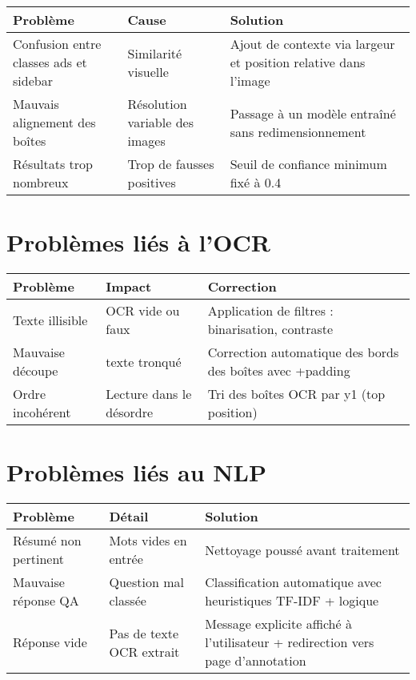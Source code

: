 \documentclass[12pt,a4paper]{report}
\begin{document}
\begin{longtable}{|p{3cm}|p{5cm}|p{6cm}|}
\hline
\textbf{Problème} & \textbf{Cause} & \textbf{Solution} \\
\hline
Confusion entre classes ads et sidebar & Similarité visuelle & Ajout de contexte via largeur et position relative dans l'image \\
\hline
Mauvais alignement des boîtes & Résolution variable des images & Passage à un modèle entraîné sans redimensionnement \\
\hline
Résultats trop nombreux & Trop de fausses positives & Seuil de confiance minimum fixé à 0.4 \\
\hline
\end{longtable}

\section{Problèmes liés à l'OCR}

\begin{longtable}{|p{3cm}|p{5cm}|p{6cm}|}
\hline
\textbf{Problème} & \textbf{Impact} & \textbf{Correction} \\
\hline
Texte illisible & OCR vide ou faux & Application de filtres : binarisation, contraste \\
\hline
Mauvaise découpe & texte tronqué & Correction automatique des bords des boîtes avec +padding \\
\hline
Ordre incohérent & Lecture dans le désordre & Tri des boîtes OCR par y1 (top position) \\
\hline
\end{longtable}

\section{Problèmes liés au NLP}

\begin{longtable}{|p{3cm}|p{5cm}|p{6cm}|}
\hline
\textbf{Problème} & \textbf{Détail} & \textbf{Solution} \\
\hline
Résumé non pertinent & Mots vides en entrée & Nettoyage poussé avant traitement \\
\hline
Mauvaise réponse QA & Question mal classée & Classification automatique avec heuristiques TF-IDF + logique \\
\hline
Réponse vide & Pas de texte OCR extrait & Message explicite affiché à l'utilisateur + redirection vers page d'annotation \\
\hline
\end{longtable}
\end{document}
